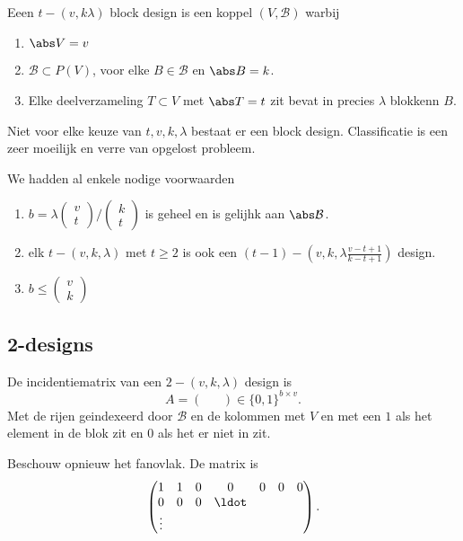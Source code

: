 \begin{herinner}
	Eeen $t - (v, k \lambda)$ block design is een koppel $(V, \mathcal{B} )$ warbij 
	\begin{enumerate}
		\item $\abs V = v$ 
		\item $\mathcal{B} \subset  P(V)$, voor elke $B \in \mathcal{B} $ en $\abs B = k$.
		\item Elke deelverzameling $T \subset V$ met $\abs T = t$ zit bevat in precies $\lambda$ blokkenn $B$. 
	\end{enumerate}
\end{herinner}
Niet voor elke keuze van $t,v, k, \lambda$ bestaat er een block design. Classificatie is een zeer moeilijk en verre van opgelost probleem.

We hadden al enkele nodige voorwaarden
\begin{enumerate}
	\item $b = \lambda \begin{pmatrix} v \\ t \end{pmatrix} / \begin{pmatrix} k \\ t \end{pmatrix} $ is geheel en is gelijhk aan $\abs \mathcal{B} $.
	\item elk $t-(v, k, \lambda)$ met $t \ge 2 $ is ook een $(t-1)-(v, k, \lambda \frac{v - t + 1}{k - t + 1})$ design.
	\item $b \le \begin{pmatrix} v \\ k \end{pmatrix} $
\end{enumerate}

\subsection{2-designs} \label{sec:2-designs}
\begin{definitie}
	De incidentiematrix van een $2 - (v, k, \lambda)$ design is \[
		A = \begin{pmatrix}  &  \\ & \end{pmatrix} \in \{0,1\}^{b\times v} 
	.\] 
	Met de rijen geindexeerd door $\mathcal{B} $ en de kolommen met $V$ en met een $1$ als het element in de blok zit en $0$ als het er niet in zit.
\end{definitie}
\begin{voorbeeld}
	Beschouw opnieuw het fanovlak. De matrix is \[
		\begin{pmatrix} 1 & 1 & 0 & 0 & 0 & 0 &0 \\ 0 & 0&0 & \ldot \\ \vdots \end{pmatrix} 
	.\] 
\end{voorbeeld}
